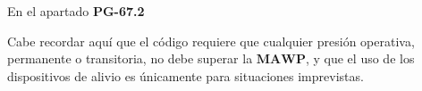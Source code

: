 En el apartado \textbf{PG-67.2}

Cabe recordar aquí que el código requiere que cualquier presión operativa, permanente o transitoria, no debe superar la $\mathbf{MAWP}$, y que el uso de los dispositivos de alivio es únicamente para situaciones imprevistas.
























